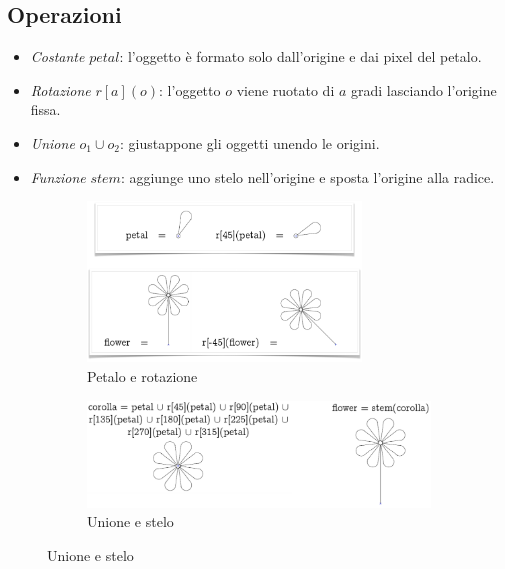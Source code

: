 \documentclass[a4paper,oneside,titlepage]{book}
\begin{document}
\subsection{Operazioni}
\begin{itemize}
    \item \textit{Costante} $petal$: l'oggetto è formato solo dall'origine e dai pixel del petalo.
    \item \textit{Rotazione} $r[a](o)$: l'oggetto $o$ viene ruotato di $a$ gradi lasciando l'origine fissa.
    \item \textit{Unione} $o_1 \cup o_2$: giustappone gli oggetti unendo le origini.
    \item \textit{Funzione} $stem$: aggiunge uno stelo nell'origine e sposta l'origine alla radice.
\end{itemize}
\begin{figure}[htp]
	\begin{subfigure}{0.49\textwidth}
	    \centering
		\includegraphics[width=0.8\textwidth]{fioriOp1.png}
		\caption{Petalo e rotazione}
	\end{subfigure}
	\hfill
	\begin{subfigure}{0.49\textwidth}
		\includegraphics[width=\textwidth, height=\textheight, keepaspectratio]{fioriOp2.png}
		\caption{Unione e stelo}
	\end{subfigure}
\end{figure}
\end{document}
